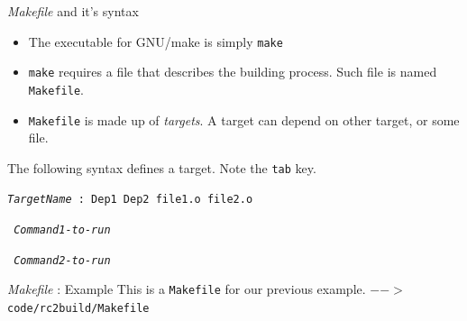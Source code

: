 \begin{frame}{\textit{Makefile} and it's syntax}
\begin{itemize}
	\item The executable for GNU/make is simply \texttt{make}
	\item \texttt{make} requires a file that describes the building process. Such file is named \texttt{Makefile}. 
	\item \texttt{Makefile} is made up of \textit{targets}. A target can depend on other target, or some file.
\end{itemize}

The following syntax defines a target. Note the \texttt{tab} key.

\vspace{0.1in}

\texttt{\textit{TargetName} : Dep1 Dep2 file1.o file2.o}

\texttt{\keys{\tab} \textit{Command1-to-run}}

\texttt{\keys{\tab} \textit{Command2-to-run}}

\end{frame}

\begin{frame}{\textit{Makefile} : Example}
This is a \texttt{Makefile} for our previous example.
\texttt{$-->$ code/rc2build/Makefile}
\inputminted{c++}{code/rc2build/Makefile}
\end{frame}

